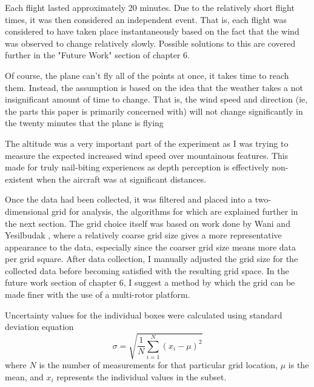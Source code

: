 \documentclass[12pt]{report}
\begin{document}
Each flight lasted approximately 20 minutes. Due to the relatively short flight times, it was then considered an independent event. That is, each flight was considered to have taken place instantaneously based on the fact that the wind was observed to change relatively slowly. Possible solutions to this are covered further in the "Future Work" section of chapter 6. 

Of course, the plane can't fly all of the points at once, it takes time to reach them. Instead, the assumption is based on the idea that the weather takes a not insignificant amount of time to change. That is, the wind speed and direction (ie, the parts this paper is primarily concerned with) will not change significantly in the twenty minutes that the plane is flying

The altitude was a very important part of the experiment as I was trying to measure the expected increased wind speed over mountainous features. This made for truly nail-biting experiences as depth perception is effectively non-existent when the aircraft was at significant distances.

Once the data had been collected, it was filtered and placed into a two-dimensional grid for analysis, the algorithms for which are explained further in the next section. The grid choice itself was based on work done by Wani and Yesilbudak \cite{Wani13}, where a relatively coarse grid size gives a more representative appearance to the data, especially since the coarser grid size means more data per grid square. After data collection, I manually adjusted the grid size for the collected data before becoming satisfied with the resulting grid space. In the future work section of chapter 6, I suggest a method by which the grid can be made finer with the use of a multi-rotor platform.

Uncertainty values for the individual boxes were calculated using standard deviation equation
\begin{equation}
	\sigma=\sqrt{\frac{1}{N}\sum\limits_{i=1}^N(x_i-\mu)^2}
	\label{eq:standard_deviation}
\end{equation}
where $N$ is the number of measurements for that particular grid location, $\mu$ is the mean, and $x_i$ represents the individual values in the subset.
\end{document}

